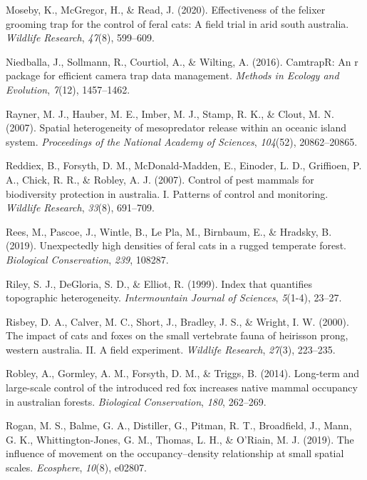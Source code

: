 \documentclass[]{elsarticle} %
\begin{document}
\leavevmode\hypertarget{ref-moseby2020effectiveness}{}%
Moseby, K., McGregor, H., \& Read, J. (2020). Effectiveness of the felixer grooming trap for the control of feral cats: A field trial in arid south australia. \emph{Wildlife Research}, \emph{47}(8), 599--609.

\leavevmode\hypertarget{ref-niedballa2016}{}%
Niedballa, J., Sollmann, R., Courtiol, A., \& Wilting, A. (2016). CamtrapR: An r package for efficient camera trap data management. \emph{Methods in Ecology and Evolution}, \emph{7}(12), 1457--1462.

\leavevmode\hypertarget{ref-rayner2007}{}%
Rayner, M. J., Hauber, M. E., Imber, M. J., Stamp, R. K., \& Clout, M. N. (2007). Spatial heterogeneity of mesopredator release within an oceanic island system. \emph{Proceedings of the National Academy of Sciences}, \emph{104}(52), 20862--20865.

\leavevmode\hypertarget{ref-reddiex2007}{}%
Reddiex, B., Forsyth, D. M., McDonald-Madden, E., Einoder, L. D., Griffioen, P. A., Chick, R. R., \& Robley, A. J. (2007). Control of pest mammals for biodiversity protection in australia. I. Patterns of control and monitoring. \emph{Wildlife Research}, \emph{33}(8), 691--709.

\leavevmode\hypertarget{ref-rees2019}{}%
Rees, M., Pascoe, J., Wintle, B., Le Pla, M., Birnbaum, E., \& Hradsky, B. (2019). Unexpectedly high densities of feral cats in a rugged temperate forest. \emph{Biological Conservation}, \emph{239}, 108287.

\leavevmode\hypertarget{ref-riley1999}{}%
Riley, S. J., DeGloria, S. D., \& Elliot, R. (1999). Index that quantifies topographic heterogeneity. \emph{Intermountain Journal of Sciences}, \emph{5}(1-4), 23--27.

\leavevmode\hypertarget{ref-risbey2000}{}%
Risbey, D. A., Calver, M. C., Short, J., Bradley, J. S., \& Wright, I. W. (2000). The impact of cats and foxes on the small vertebrate fauna of heirisson prong, western australia. II. A field experiment. \emph{Wildlife Research}, \emph{27}(3), 223--235.

\leavevmode\hypertarget{ref-robley2014}{}%
Robley, A., Gormley, A. M., Forsyth, D. M., \& Triggs, B. (2014). Long-term and large-scale control of the introduced red fox increases native mammal occupancy in australian forests. \emph{Biological Conservation}, \emph{180}, 262--269.

\leavevmode\hypertarget{ref-rogan2019}{}%
Rogan, M. S., Balme, G. A., Distiller, G., Pitman, R. T., Broadfield, J., Mann, G. K., Whittington-Jones, G. M., Thomas, L. H., \& O'Riain, M. J. (2019). The influence of movement on the occupancy--density relationship at small spatial scales. \emph{Ecosphere}, \emph{10}(8), e02807.
\end{document}
